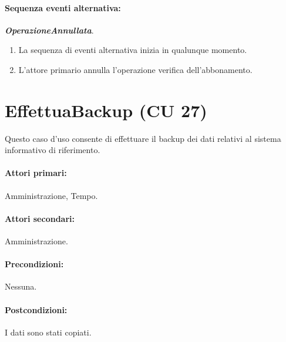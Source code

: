 \documentclass{article}
\begin{document}
    	\paragraph{Sequenza eventi alternativa:} \textbf{\textit{OperazioneAnnullata}}.
	\begin{enumerate}[itemsep=8pt,parsep=0pt]
	\item La sequenza di eventi alternativa inizia in qualunque momento.
	\item L'attore primario annulla l'operazione verifica dell'abbonamento.
	\end{enumerate}
    
    
    
    


\newpage

\section*{EffettuaBackup (CU 27)}
	
	\indent\indent Questo caso d’uso consente di effettuare il backup dei dati relativi al sistema informativo di riferimento.
	
	\paragraph{Attori primari:}Amministrazione, Tempo.
	
	\paragraph{Attori secondari:}Amministrazione.
	
	\paragraph{Precondizioni:}Nessuna.
	
	\paragraph{Postcondizioni:}I dati sono stati copiati.
	
\end{document}
